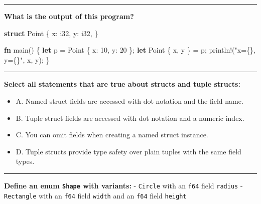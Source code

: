 \documentclass[
  11pt,
]{article}
\newenvironment{Shaded}{}{}
\newcommand{\DataTypeTok}[1]{\textcolor[rgb]{0.56,0.13,0.00}{#1}}
\newcommand{\DecValTok}[1]{\textcolor[rgb]{0.25,0.63,0.44}{#1}}
\newcommand{\KeywordTok}[1]{\textcolor[rgb]{0.00,0.44,0.13}{\textbf{#1}}}
\newcommand{\NormalTok}[1]{#1}
\newcommand{\OperatorTok}[1]{\textcolor[rgb]{0.40,0.40,0.40}{#1}}
\newcommand{\PreprocessorTok}[1]{\textcolor[rgb]{0.74,0.48,0.00}{#1}}
\newcommand{\StringTok}[1]{\textcolor[rgb]{0.25,0.44,0.63}{#1}}
\providecommand{\tightlist}{%
  \setlength{\itemsep}{0pt}\setlength{\parskip}{0pt}}
\begin{document}
\begin{center}\rule{0.5\linewidth}{0.5pt}\end{center}

\textbf{What is the output of this program?}

\begin{Shaded}
\begin{Highlighting}[]
\KeywordTok{struct}\NormalTok{ Point }\OperatorTok{\{}
\NormalTok{    x}\OperatorTok{:} \DataTypeTok{i32}\OperatorTok{,}
\NormalTok{    y}\OperatorTok{:} \DataTypeTok{i32}\OperatorTok{,}
\OperatorTok{\}}

\KeywordTok{fn}\NormalTok{ main() }\OperatorTok{\{}
    \KeywordTok{let}\NormalTok{ p }\OperatorTok{=}\NormalTok{ Point }\OperatorTok{\{}\NormalTok{ x}\OperatorTok{:} \DecValTok{10}\OperatorTok{,}\NormalTok{ y}\OperatorTok{:} \DecValTok{20} \OperatorTok{\};}
    \KeywordTok{let}\NormalTok{ Point }\OperatorTok{\{}\NormalTok{ x}\OperatorTok{,}\NormalTok{ y }\OperatorTok{\}} \OperatorTok{=}\NormalTok{ p}\OperatorTok{;}
    \PreprocessorTok{println!}\NormalTok{(}\StringTok{"x=\{\}, y=\{\}"}\OperatorTok{,}\NormalTok{ x}\OperatorTok{,}\NormalTok{ y)}\OperatorTok{;}
\OperatorTok{\}}
\end{Highlighting}
\end{Shaded}

\begin{center}\rule{0.5\linewidth}{0.5pt}\end{center}

\textbf{Select all statements that are true about structs and tuple
structs:}

\begin{itemize}
\tightlist
\item[$\square$]
  A. Named struct fields are accessed with dot notation and the field
  name.
\item[$\square$]
  B. Tuple struct fields are accessed with dot notation and a numeric
  index.
\item[$\square$]
  C. You can omit fields when creating a named struct instance.
\item[$\square$]
  D. Tuple structs provide type safety over plain tuples with the same
  field types.
\end{itemize}

\begin{center}\rule{0.5\linewidth}{0.5pt}\end{center}

\textbf{Define an enum \texttt{Shape} with variants:} - \texttt{Circle}
with an \texttt{f64} field \texttt{radius} - \texttt{Rectangle} with an
\texttt{f64} field \texttt{width} and an \texttt{f64} field
\texttt{height}
\end{document}
